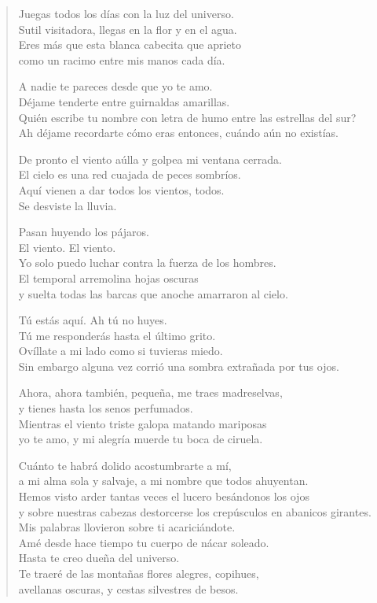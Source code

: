 \documentclass[12pt]{article}
\begin{document}
\clearpage
{}
\begin{verse}

Juegas todos los días con la luz del universo.\\
Sutil visitadora, llegas en la flor y en el agua.\\
Eres más que esta blanca cabecita que aprieto\\
como un racimo entre mis manos cada día.  

A nadie te pareces desde que yo te amo.\\
Déjame tenderte entre guirnaldas amarillas.\\
Quién escribe tu nombre con letra de humo entre las estrellas del sur?\\
Ah déjame recordarte cómo eras entonces, cuándo aún no existías.  

De pronto el viento aúlla y golpea mi ventana cerrada.\\
El cielo es una red cuajada de peces sombríos.\\
Aquí vienen a dar todos los vientos, todos.\\
Se desviste la lluvia.  

Pasan huyendo los pájaros.\\
El viento. El viento.\\
Yo solo puedo luchar contra la fuerza de los hombres.\\
El temporal arremolina hojas oscuras\\
y suelta todas las barcas que anoche amarraron al cielo.  

Tú estás aquí. Ah tú no huyes.\\
Tú me responderás hasta el último grito.\\
Ovíllate a mi lado como si tuvieras miedo.\\
Sin embargo alguna vez corrió una sombra extrañada por tus ojos.  

Ahora, ahora también, pequeña, me traes madreselvas,\\
y tienes hasta los senos perfumados.\\
Mientras el viento triste galopa matando mariposas\\
yo te amo, y mi alegría muerde tu boca de ciruela.  

Cuánto te habrá dolido acostumbrarte a mí,\\
a mi alma sola y salvaje, a mi nombre que todos ahuyentan.\\
Hemos visto arder tantas veces el lucero besándonos los ojos\\
y sobre nuestras cabezas destorcerse los crepúsculos en abanicos girantes.\\
Mis palabras llovieron sobre ti acariciándote.\\
Amé desde hace tiempo tu cuerpo de nácar soleado.\\
Hasta te creo dueña del universo.\\
Te traeré de las montañas flores alegres, copihues,\\
avellanas oscuras, y cestas silvestres de besos.  


\end{verse}
\end{document}
